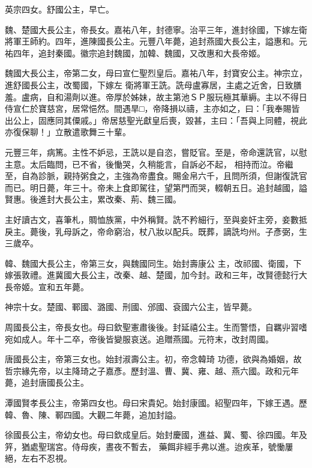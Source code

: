 \begin{pinyinscope}
 英宗四女。舒國公主，早亡。



 魏、楚國大長公主，帝長女。嘉祐八年，封德寧。治平三年，進封徐國，下嫁左衛將軍王師約。四年，進陳國長公主。元豐八年薨，追封燕國大長公主，謚惠和。元祐四年，追封秦國。徽宗追封魏國，加韓、魏國，又改惠和大長帝姬。



 魏國大長公主，帝第二女，母曰宣仁聖烈皇后。嘉祐八年，封寶安公主。神宗立，進舒國長公主，改蜀國，下嫁左
 衛將軍王詵。詵母盧寡居，主處之近舍，日致膳羞。盧病，自和湯劑以進。帝厚於姊妹，故主第池ＳＰ服玩極其華縟。主以不得日侍宣仁於寶慈宮，居常悒然。間遇旱□，帝降損以禱，主亦如之，曰：「我奉賜皆出公上，固應同其僳戚。」帝居慈聖光獻皇后喪，毀甚，主曰：「吾與上同體，視此亦復保聊！」立散遣歌舞三十輩。



 元豐三年，病篤。主性不妒忌，王詵以是自恣，嘗貶官。至是，帝命還詵官，以慰主意。太后臨問，已不省，後慟哭，久稍能言，自訴必不起，
 相持而泣。帝繼至，自為診脈，親持粥食之，主強為帝盡食。賜金帛六千，且問所須，但謝復詵官而已。明日薨，年三十。帝未上食即駕往，望第門而哭，輟朝五日。追封越國，謚賢惠。後進封大長公主，累改秦、荊、魏三國。



 主好讀古文，喜筆札，賙恤族黨，中外稱賢。詵不矜細行，至與妾奸主旁，妾數抵戾主。薨後，乳母訴之，帝命窮治，杖八妝以配兵。既葬，謫詵均州。子彥弼，生三歲卒。



 韓、魏國大長公主，帝第三女，與魏國同生。始封壽康公
 主，改祁國、衛國，下嫁張敦禮。進冀國大長公主，改秦、越、楚國，加今封。政和三年，改賢德懿行大長帝姬。宣和五年薨。



 神宗十女。楚國、鄆國、潞國、刑國、邠國、袞國六公主，皆早薨。



 周國長公主，帝長女也。母曰欽聖憲肅後後。封延禧公主。生而警悟，自羈丱習嗜宛如成人。年十二卒，帝後皆變服哀送。追贈燕國。元符末，改封周國。



 唐國長公主，帝第三女也。始封淑壽公主。初，帝念韓琦
 功德，欲與為婚姻，故哲宗緣先帝，以主降琦之子嘉彥。歷封溫、曹、冀、雍、越、燕六國。政和元年薨，追封唐國長公主。



 潭國賢孝長公主，帝第四女也。母曰宋貴妃。始封康國。紹聖四年，下嫁王遇。歷韓、魯、陳、鄆四國。大觀二年薨，追加封謚。



 徐國長公主，帝幼女也。母曰欽成皇后。始封慶國，進益、冀、蜀、徐四國。年及笄，猶處聖瑞宮。侍母疾，晝夜不暫去，
 藥餌非經手弗以進。迨疾革，號慟屢絕，左右不忍視。




\end{pinyinscope}
